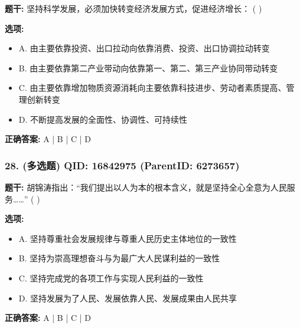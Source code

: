 \documentclass[12pt,UTF8]{ctexart}
\begin{document}
\textbf{题干:}
坚持科学发展，必须加快转变经济发展方式，促进经济增长： ( )



\textbf{选项:}
\begin{itemize}[leftmargin=*]

  \item A. 由主要依靠投资、出口拉动向依靠消费、投资、出口协调拉动转变

  \item B. 由主要依靠第二产业带动向依靠第一、第二、第三产业协同带动转变

  \item C. 由主要依靠增加物质资源消耗向主要依靠科技进步、劳动者素质提高、管理创新转变

  \item D. 不断提高发展的全面性、协调性、可持续性

\end{itemize}

\textbf{正确答案:}
A | B | C | D

\vspace{0.3em}\hrulefill\vspace{0.7em}

\subsubsection*{28. (多选题) \small QID: 16842975 (ParentID: 6273657)}

\textbf{题干:}
胡锦涛指出：“我们提出以人为本的根本含义，就是坚持全心全意为人民服务……” ( )



\textbf{选项:}
\begin{itemize}[leftmargin=*]

  \item A. 坚持尊重社会发展规律与尊重人民历史主体地位的一致性

  \item B. 坚持为崇高理想奋斗与为最广大人民谋利益的一致性

  \item C. 坚持完成党的各项工作与实现人民利益的一致性

  \item D. 坚持发展为了人民、发展依靠人民、发展成果由人民共享

\end{itemize}

\textbf{正确答案:}
A | B | C | D

\vspace{0.3em}\hrulefill\vspace{0.7em}
\end{document}
